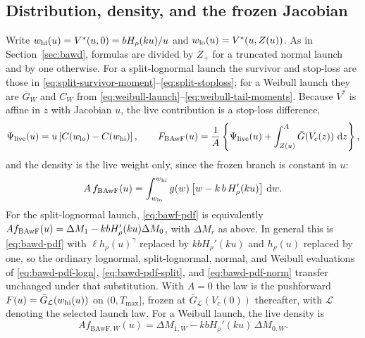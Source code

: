 \documentclass[12pt]{article}
\newcommand{\dd}{\,\mathrm{d}}
\newcommand{\Gbar}{\bar{G}}
\theoremstyle{remark}
\begin{document}
\subsection{Distribution, density, and the frozen Jacobian}
Write $w_{\rm hi}(u)=V^{*}(u,0)=bH_\rho(ku)/u$ and $w_{\rm lo}(u)=V^{*}(u,Z(u))$. As in Section~\ref{sec:bawd}, formulas are divided by $Z_+$ for a truncated normal launch and by one otherwise. For a split-lognormal launch the survivor and stop-loss are those in
\eqref{eq:split-survivor-moment}--\eqref{eq:split-stoploss}; for a Weibull
launch they are $\Gbar_W$ and $C_W$ from
\eqref{eq:weibull-launch}--\eqref{eq:weibull-tail-moments}. Because
$V^{*}$ is affine in $z$ with Jacobian $u$, the live contribution is a stop-loss difference,
\begin{equation}
  \Psi_{\rm live}(u) = u\left[C(w_{\rm lo}) - C(w_{\rm hi})\right],
  \qquad
  F_{\rm BAwF}(u) = \frac{1}{A}\left\{
    \Psi_{\rm live}(u) + \int_{Z(u)}^{A}\Gbar\!\left(V_c(z)\right)\dd z
  \right\},
  \label{eq:bawf-cdf}
\end{equation}
and the density is the live weight only, since the frozen branch is constant in $u$:
\begin{equation}
  A\,f_{\rm BAwF}(u)
  = \int_{w_{\rm lo}}^{w_{\rm hi}}
      g(w)\left[w - k\,b\,H_\rho'(ku)\right]\dd w.
  \label{eq:bawf-pdf}
\end{equation}
For the split-lognormal launch, \eqref{eq:bawf-pdf} is equivalently $A f_{\rm BAwF}(u)=\Delta M_1-kbH_\rho'(ku)\Delta M_0$, with $\Delta M_r$ as above. In general this is \eqref{eq:bawd-pdf} with $\ell h_\rho(u)^\gamma$ replaced by $k b H_\rho'(ku)$ and $h_\rho(u)$ replaced by one, so the ordinary lognormal, split-lognormal, normal, and Weibull evaluations of \eqref{eq:bawd-pdf-logn},
\eqref{eq:bawd-pdf-split}, and \eqref{eq:bawd-pdf-norm} transfer
unchanged under that substitution. With $A=0$ the law is the pushforward $F(u)=\Gbar_{\mathcal L}(w_{\rm hi}(u))$ on $(0,T_{\max}]$, frozen at $\Gbar_{\mathcal L}(V_c(0))$ thereafter, with $\mathcal L$ denoting the selected launch law. For a Weibull launch, the live density is
\begin{equation}
  A f_{\mathrm{BAwF},W}(u)
   =\Delta M_{1,W}-kbH_\rho'(ku)\,\Delta M_{0,W}.
  \label{eq:bawf-pdf-weibull}
\end{equation}
\end{document}
